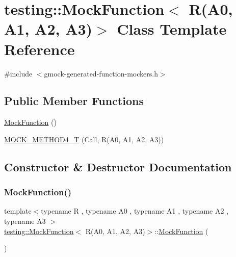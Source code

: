 \hypertarget{classtesting_1_1MockFunction_3_01R_07A0_00_01A1_00_01A2_00_01A3_08_4}{}\section{testing\+::Mock\+Function$<$ R(A0, A1, A2, A3)$>$ Class Template Reference}
\label{classtesting_1_1MockFunction_3_01R_07A0_00_01A1_00_01A2_00_01A3_08_4}


{\ttfamily \#include $<$gmock-\/generated-\/function-\/mockers.\+h$>$}

\subsection*{Public Member Functions}
\begin{DoxyCompactItemize}
\item 
\mbox{\hyperlink{classtesting_1_1MockFunction_3_01R_07A0_00_01A1_00_01A2_00_01A3_08_4_abf2185b2c08c575374074520778f574a}{Mock\+Function}} ()
\item 
\mbox{\hyperlink{classtesting_1_1MockFunction_3_01R_07A0_00_01A1_00_01A2_00_01A3_08_4_ad158c25a1b33cb53bae3f0eb9df0d59c}{M\+O\+C\+K\+\_\+\+M\+E\+T\+H\+O\+D4\+\_\+T}} (Call, R(A0, A1, A2, A3))
\end{DoxyCompactItemize}


\subsection{Constructor \& Destructor Documentation}
\mbox{\label{classtesting_1_1MockFunction_3_01R_07A0_00_01A1_00_01A2_00_01A3_08_4_abf2185b2c08c575374074520778f574a}} 
\subsubsection{\texorpdfstring{MockFunction()}{MockFunction()}}
{\footnotesize\ttfamily template$<$typename R , typename A0 , typename A1 , typename A2 , typename A3 $>$ \\
\mbox{\hyperlink{classtesting_1_1MockFunction}{testing\+::\+Mock\+Function}}$<$ R(A0, A1, A2, A3)$>$\+::\mbox{\hyperlink{classtesting_1_1MockFunction}{Mock\+Function}} (\begin{DoxyParamCaption}{ }\end{DoxyParamCaption})\hspace{0.3cm}{\ttfamily [inline]}}



